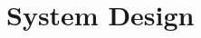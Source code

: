 \documentclass[conference]{IEEEtran}
\newcommand{\cmark}{\ding{51}}
\newcommand{\xmark}{\ding{55}}
\begin{document}

\section{System Design}
\label{sec:sysdesign}
\end{document}
